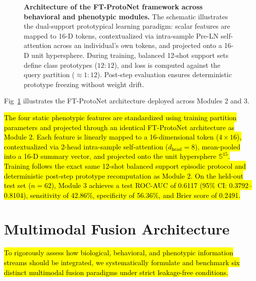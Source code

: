 \documentclass[10pt,letterpaper]{article}
\begin{document}
        \begin{figure}[!h]
        \caption{\textbf{Architecture of the FT-ProtoNet framework across behavioral and phenotypic modules.}
        The schematic illustrates the dual-support prototypical learning paradigm: scalar features are mapped to 16-D tokens, contextualized via intra-sample Pre-LN self-attention across an individual's own tokens, and projected onto a 16-D unit hypersphere. During training, balanced 12-shot support sets define class prototypes ($12:12$), and loss is computed against the query partition ($\approx 1:12$). Post-step evaluation ensures deterministic prototype freezing without weight drift.}
        \label{fig:proto_architecture}
        \end{figure}

        Fig~\ref{fig:proto_architecture} illustrates the FT-ProtoNet architecture deployed across Modules 2 and 3.

        \hl{The four static phenotypic features are standardized using training partition parameters and projected through an identical FT-ProtoNet architecture as Module 2. Each feature is linearly mapped to a 16-dimensional token ($4 \times 16$), contextualized via 2-head intra-sample self-attention ($d_{\text{head}} = 8$), mean-pooled into a 16-D summary vector, and projected onto the unit hypersphere $\mathbb{S}^{15}$. Training follows the exact same 12-shot balanced support episodic protocol and deterministic post-step prototype recomputation as Module 2. On the held-out test set ($n=62$), Module 3 achieves a test ROC-AUC of 0.6117 (95\% CI: 0.3792--0.8104), sensitivity of 42.86\%, specificity of 56.36\%, and Brier score of 0.2491.}

        \section*{Multimodal Fusion Architecture}

        \hl{To rigorously assess how biological, behavioral, and phenotypic information streams should be integrated, we systematically formulate and benchmark six distinct multimodal fusion paradigms under strict leakage-free conditions.}
\end{document}
